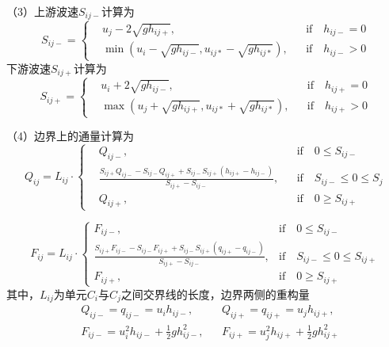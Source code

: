 （3）上游波速$S_{ij-}$计算为
\begin{equation}
  S_{ij-} = \left\{
    \begin{aligned}
      &u_j - 2\sqrt{gh_{ij+}}, && \mbox{if} \quad h_{ij-} = 0 \\
      & \min \left(u_i - \sqrt{gh_{ij-}}, u_{ij*} - \sqrt{gh_{ij*}}\right), && \mbox{if} \quad h_{ij-} > 0
  \end{aligned}\right.
\end{equation}
下游波速$S_{ij+}$计算为
\begin{equation}
  S_{ij+} = \left\{
    \begin{aligned}
      &u_i + 2\sqrt{gh_{ij-}}, && \mbox{if} \quad h_{ij+} = 0 \\
      & \max \left(u_j + \sqrt{gh_{ij+}}, u_{ij*} + \sqrt{gh_{ij*}}\right), && \mbox{if} \quad h_{ij+} > 0
  \end{aligned}\right.
\end{equation}

（4）边界上的通量计算为
\begin{equation}
  Q_{ij} = L_{ij} \cdot \left\{
    \begin{aligned}
      & Q_{ij-}, && \mbox{if} \quad 0\leqslant S_{ij-} \\
      & \frac{S_{ij+} Q_{ij-} - S_{ij-} Q_{ij+} + S_{ij-} S_{ij+} \left(h_{ij+} - h_{ij-}\right)}{S_{ij+}-S_{ij-}} , && \mbox{if} \quad S_{ij-} \leqslant 0\leqslant S_j\\
      & Q_{ij+}, && \mbox{if} \quad 0\geqslant S_{ij+}
  \end{aligned}\right.
\end{equation}

\begin{equation}
  F_{ij} = L_{ij} \cdot
  \begin{cases}
    F_{ij-}, & \mbox{if} \quad 0\leqslant S_{ij-} \\
    \frac{S_{ij+} F_{ij-} - S_{ij-} F_{ij+} + S_{ij-} S_{ij+} \left(q_{ij+} - q_{ij-}\right)}{S_{ij+}-S_{ij-}} , & \mbox{if} \quad S_{ij-} \leqslant 0\leqslant S_{ij+}\\
    F_{ij+}, & \mbox{if} \quad 0\geqslant S_{ij+}
  \end{cases}
\end{equation}
其中，$L_{ij}$为单元$C_i$与$C_j$之间交界线的长度，边界两侧的重构量
\begin{align*}
  &Q_{ij-} = q_{ij-} = u_i h_{ij-},  && Q_{ij+} = q_{ij+} = u_j h_{ij+}, \\
  &F_{ij-} = u_i^2h_{ij-}+\frac{1}{2}gh_{ij-}^2, && F_{ij+} = u_j^2h_{ij+}+\frac{1}{2}gh_{ij+}^2
\end{align*}

